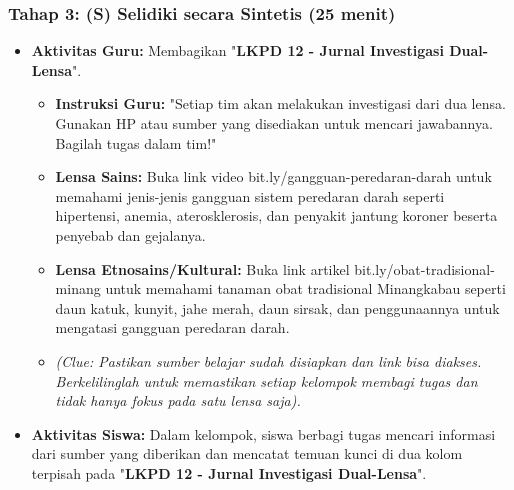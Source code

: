 \documentclass[a4paper,12pt]{article}
\begin{document}
\subsubsection{Tahap 3: (S) Selidiki secara Sintetis (25 menit)}
\begin{itemize}
\item \textbf{Aktivitas Guru:} Membagikan "\textbf{LKPD 12 - Jurnal Investigasi Dual-Lensa}".
    \begin{itemize}
    \item \textbf{Instruksi Guru:} "Setiap tim akan melakukan investigasi dari dua lensa. Gunakan HP atau sumber yang disediakan untuk mencari jawabannya. Bagilah tugas dalam tim!"
    \item \textbf{Lensa Sains:} Buka link video bit.ly/gangguan-peredaran-darah untuk memahami jenis-jenis gangguan sistem peredaran darah seperti hipertensi, anemia, aterosklerosis, dan penyakit jantung koroner beserta penyebab dan gejalanya.
    \item \textbf{Lensa Etnosains/Kultural:} Buka link artikel bit.ly/obat-tradisional-minang untuk memahami tanaman obat tradisional Minangkabau seperti daun katuk, kunyit, jahe merah, daun sirsak, dan penggunaannya untuk mengatasi gangguan peredaran darah.
    \item \textit{(Clue: Pastikan sumber belajar sudah disiapkan dan link bisa diakses. Berkelilinglah untuk memastikan setiap kelompok membagi tugas dan tidak hanya fokus pada satu lensa saja).}
    \end{itemize}
\item \textbf{Aktivitas Siswa:} Dalam kelompok, siswa berbagi tugas mencari informasi dari sumber yang diberikan dan mencatat temuan kunci di dua kolom terpisah pada "\textbf{LKPD 12 - Jurnal Investigasi Dual-Lensa}".
\end{itemize}
\end{document}
